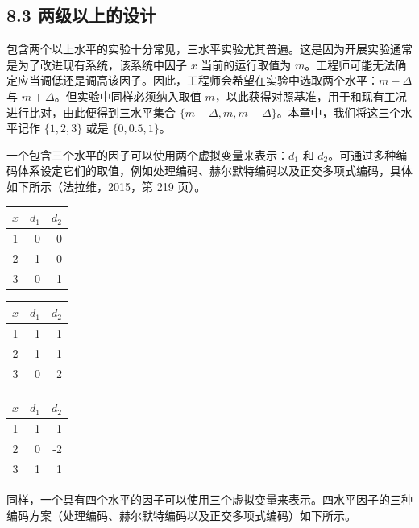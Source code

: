 \documentclass{ctexart}
\begin{document}
\subsection*{8.3 两级以上的设计}

包含两个以上水平的实验十分常见，三水平实验尤其普遍。这是因为开展实验通常是为了改进现有系统，该系统中因子 $x$ 当前的运行取值为 $m$。工程师可能无法确定应当调低还是调高该因子。因此，工程师会希望在实验中选取两个水平：$m-\Delta$ 与 $m+\Delta$。但实验中同样必须纳入取值 $m$，以此获得对照基准，用于和现有工况进行比对，由此便得到三水平集合 $\{m-\Delta,m,m+\Delta\}$。本章中，我们将这三个水平记作 $\{1,2,3\}$ 或是 $\{0,0.5,1\}$。

一个包含三个水平的因子可以使用两个虚拟变量来表示：$d_1$ 和 $d_2$。可通过多种编码体系设定它们的取值，例如处理编码、赫尔默特编码以及正交多项式编码，具体如下所示（法拉维，2015，第 219 页）。

\begin{table}[htbp]
\begin{tabular}{c|r|r}
\hline
$x$ & $d_1$ & $d_2$ \\
\hline
1 & 0 & 0 \\
2 & 1 & 0 \\
3 & 0 & 1 \\
\hline
\end{tabular}
\end{table}

\begin{table}[htbp]
\begin{tabular}{c|r|r}
\hline
$x$ & $d_1$ & $d_2$ \\
\hline
1 & -1 & -1 \\
2 & 1 & -1 \\
3 & 0 & 2 \\
\hline
\end{tabular}
\end{table}

\begin{table}[htbp]
\begin{tabular}{c|r|r}
\hline
$x$ & $d_1$ & $d_2$ \\
\hline
1 & -1 & 1 \\
2 & 0 & -2 \\
3 & 1 & 1 \\
\hline
\end{tabular}
\end{table}

同样，一个具有四个水平的因子可以使用三个虚拟变量来表示。四水平因子的三种编码方案（处理编码、赫尔默特编码以及正交多项式编码）如下所示。
\end{document}

